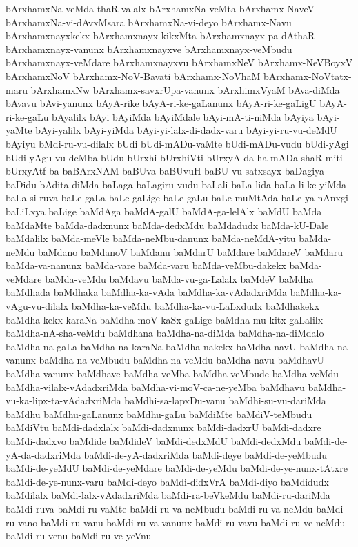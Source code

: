 {bArxhamxNa-veMda-thaR-valalx
bArxhamxNa-veMta
bArxhamx-NaveV
bArxhamxNa-vi-dAvxMsara
bArxhamxNa-vi-deyo
bArxhamx-Navu
bArxhamxnayxkekx
bArxhamxnayx-kikxMta
bArxhamxnayx-pa-dAthaR
bArxhamxnayx-vanunx
bArxhamxnayxve
bArxhamxnayx-veMbudu
bArxhamxnayx-veMdare
bArxhamxnayxvu
bArxhamxNeV
bArxhamx-NeVBoyxV
bArxhamxNoV
bArxhamx-NoV-Bavati
bArxhamx-NoVhaM
bArxhamx-NoVtatx-maru
bArxhamxNw
bArxhamx-savxrUpa-vanunx
bArxhimxVyaM
bAva-diMda
bAvavu
bAvi-yanunx
bAyA-rike
bAyA-ri-ke-gaLanunx
bAyA-ri-ke-gaLigU
bAyA-ri-ke-gaLu
bAyalilx
bAyi
bAyiMda
bAyiMdale
bAyi-mA-ti-niMda
bAyiya
bAyi-yaMte
bAyi-yalilx
bAyi-yiMda
bAyi-yi-lalx-di-dadx-varu
bAyi-yi-ru-vu-deMdU
bAyiyu
bMdi-ru-vu-dilalx
bUdi
bUdi-mADu-vaMte
bUdi-mADu-vudu
bUdi-yAgi
bUdi-yAgu-vu-deMba
bUdu
bUrxhi
bUrxhiVti
bUrxyA-da-ha-mADa-shaR-miti
bUrxyAtf
ba
baBArxNAM
baBUva
baBUvuH
baBU-vu-satxsayx
baDagiya
baDidu
bAdita-diMda
baLaga
baLagiru-vudu
baLali
baLa-lida
baLa-li-ke-yiMda
baLa-si-ruva
baLe-gaLa
baLe-gaLige
baLe-gaLu
baLe-muMtAda
baLe-ya-nAnxgi
baLiLxya
baLige
baMdAga
baMdA-galU
baMdA-ga-lelAlx
baMdU
baMda
baMdaMte
baMda-dadxnunx
baMda-dedxMdu
baMdadudx
baMda-kU-Dale
baMdalilx
baMda-meVle
baMda-neMbu-danunx
baMda-neMdA-yitu
baMda-neMdu
baMdano
baMdanoV
baMdanu
baMdarU
baMdare
baMdareV
baMdaru
baMda-va-nanunx
baMda-vare
baMda-varu
baMda-veMbu-dakekx
baMda-veMdare
baMda-veMdu
baMdavu
baMda-vu-ga-Lalalx
baMdeV
baMdha
baMdhada
baMdhaka
baMdha-ka-vAda
baMdha-ka-vAdadxriMda
baMdha-ka-vAgu-vu-dilalx
baMdha-ka-veMdu
baMdha-ka-vu-LaLxdudx
baMdhakekx
baMdha-kekx-karaNa
baMdha-moV-kaSx-gaLige
baMdha-mu-kitx-gaLalilx
baMdha-nA-sha-veMdu
baMdhana
baMdha-na-diMda
baMdha-na-diMdalo
baMdha-na-gaLa
baMdha-na-karaNa
baMdha-nakekx
baMdha-navU
baMdha-na-vanunx
baMdha-na-veMbudu
baMdha-na-veMdu
baMdha-navu
baMdhavU
baMdha-vanunx
baMdhave
baMdha-veMba
baMdha-veMbude
baMdha-veMdu
baMdha-vilalx-vAdadxriMda
baMdha-vi-moV-ca-ne-yeMba
baMdhavu
baMdha-vu-ka-lipx-ta-vAdadxriMda
baMdhi-sa-lapxDu-vanu
baMdhi-su-vu-dariMda
baMdhu
baMdhu-gaLanunx
baMdhu-gaLu
baMdiMte
baMdiV-teMbudu
baMdiVtu
baMdi-dadxlalx
baMdi-dadxnunx
baMdi-dadxrU
baMdi-dadxre
baMdi-dadxvo
baMdide
baMdideV
baMdi-dedxMdU
baMdi-dedxMdu
baMdi-de-yA-da-dadxriMda
baMdi-de-yA-dadxriMda
baMdi-deye
baMdi-de-yeMbudu
baMdi-de-yeMdU
baMdi-de-yeMdare
baMdi-de-yeMdu
baMdi-de-ye-nunx-tAtxre
baMdi-de-ye-nunx-varu
baMdi-deyo
baMdi-didxVrA
baMdi-diyo
baMdidudx
baMdilalx
baMdi-lalx-vAdadxriMda
baMdi-ra-beVkeMdu
baMdi-ru-dariMda
baMdi-ruva
baMdi-ru-vaMte
baMdi-ru-va-neMbudu
baMdi-ru-va-neMdu
baMdi-ru-vano
baMdi-ru-vanu
baMdi-ru-va-vanunx
baMdi-ru-vavu
baMdi-ru-ve-neMdu
baMdi-ru-venu
baMdi-ru-ve-yeVnu
}
